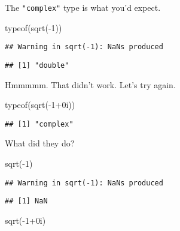 \documentclass[
]{article}
\newenvironment{Shaded}{\begin{snugshade}}{\end{snugshade}}
\newcommand{\DecValTok}[1]{\textcolor[rgb]{0.00,0.00,0.81}{#1}}
\newcommand{\FunctionTok}[1]{\textcolor[rgb]{0.00,0.00,0.00}{#1}}
\newcommand{\NormalTok}[1]{#1}
\newcommand{\SpecialCharTok}[1]{\textcolor[rgb]{0.00,0.00,0.00}{#1}}
\begin{document}
The \texttt{"complex"} type is what you'd expect.

\begin{Shaded}
\begin{Highlighting}[]
\FunctionTok{typeof}\NormalTok{(}\FunctionTok{sqrt}\NormalTok{(}\SpecialCharTok{{-}}\DecValTok{1}\NormalTok{))}
\end{Highlighting}
\end{Shaded}

\begin{verbatim}
## Warning in sqrt(-1): NaNs produced
\end{verbatim}

\begin{verbatim}
## [1] "double"
\end{verbatim}

Hmmmmm. That didn't work. Let's try again.

\begin{Shaded}
\begin{Highlighting}[]
\FunctionTok{typeof}\NormalTok{(}\FunctionTok{sqrt}\NormalTok{(}\SpecialCharTok{{-}}\DecValTok{1}\SpecialCharTok{+}\NormalTok{0i))}
\end{Highlighting}
\end{Shaded}

\begin{verbatim}
## [1] "complex"
\end{verbatim}

What did they do?

\begin{Shaded}
\begin{Highlighting}[]
\FunctionTok{sqrt}\NormalTok{(}\SpecialCharTok{{-}}\DecValTok{1}\NormalTok{)}
\end{Highlighting}
\end{Shaded}

\begin{verbatim}
## Warning in sqrt(-1): NaNs produced
\end{verbatim}

\begin{verbatim}
## [1] NaN
\end{verbatim}

\begin{Shaded}
\begin{Highlighting}[]
\FunctionTok{sqrt}\NormalTok{(}\SpecialCharTok{{-}}\DecValTok{1}\SpecialCharTok{+}\NormalTok{0i)}
\end{Highlighting}
\end{Shaded}
\end{document}
